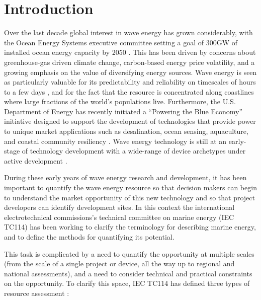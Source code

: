 \section{Introduction}

Over the last decade global interest in wave energy has grown considerably, with
the Ocean Energy Systems executive committee setting a goal of 300GW of
installed ocean energy capacity by 2050
\citep[]{huckerbyInternationalVisionOcean2017}. This has been driven by concerns
about greenhouse-gas driven climate change, carbon-based energy price
volatility, and a growing emphasis on the value of diversifying energy
sources. Wave energy is seen as particularly valuable for its predictability and
reliability on timescales of hours to a few days
\citep{parkinsonIntegratingOceanWave2015}, and for the fact that the resource is
concentrated along coastlines where large fractions of the world's populations
live. Furthermore, the U.S. Department of Energy has recently initiated a ``Powering the Blue Economy'' initiative designed to support the development of technologies that provide power to unique market applications such as desalination, ocean sensing, aquaculture, and coastal community resiliency \citep{PBE_REPORT}. Wave energy technology is still at an early-stage of technology
development with a wide-range of device archetypes under active development
\citep[]{babaritOceanWaveEnergy2017}.

During these early years of wave energy research and development, it has been
important to quantify the wave energy resource so that decision makers can begin
to understand the market opportunity of this new technology and so that project developers can identify development sites. In this context the international electrotechnical commissions's technical committee on marine energy (IEC TC114) has been working to clarify the terminology for describing marine energy, and to define the methods for quantifying its potential.

This task is complicated by a need to quantify the opportunity at multiple scales (from the scale of a single project or device, all the way up to regional and national assessments), and a need to consider technical and practical constraints on the opportunity. To clarify this space, IEC TC114 has defined three types of resource assessment
\citep{internationalelectrotechnicalcommissionPartTerminology2011} :


